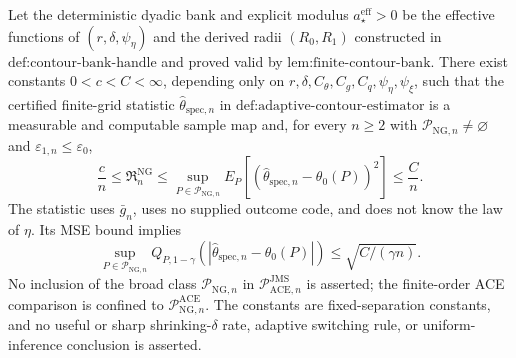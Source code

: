 Let the deterministic dyadic bank and explicit modulus \(a_{\star}^{\mathrm{eff}}>0\) be the effective functions of \((r,\delta,\psi_{\eta})\) and the derived radii \((R_0,R_1)\) constructed in \(\text{def:contour-bank-handle}\) and proved valid by \(\text{lem:finite-contour-bank}\).  There exist constants \(0<c<C<\infty\), depending only on \(r,\delta,C_{\theta},C_g,C_q,\psi_{\eta},\psi_{\xi}\), such that the certified finite-grid statistic \(\widehat\theta_{\mathrm{spec},n}\) in \(\text{def:adaptive-contour-estimator}\) is a measurable and computable sample map and, for every \(n\ge2\) with \(\mathcal P_{\mathrm{NG},n}\neq\varnothing\) and \(\varepsilon_{1,n}\le\varepsilon_0\),
\[
 \frac cn\le\mathfrak R_n^{\mathrm{NG}}
 \le\sup_{P\in\mathcal P_{\mathrm{NG},n}}
 E_P[(\widehat\theta_{\mathrm{spec},n}-\theta_0(P))^2]
 \le\frac Cn.
\]
The statistic uses \(\bar g_n\), uses no supplied outcome code, and does not know the law of \(\eta\).  Its MSE bound implies
\[
 \sup_{P\in\mathcal P_{\mathrm{NG},n}}
 Q_{P,1-\gamma}(|\widehat\theta_{\mathrm{spec},n}-\theta_0(P)|)
 \le\sqrt{C/(\gamma n)}.
\]
No inclusion of the broad class \(\mathcal P_{\mathrm{NG},n}\) in \(\mathcal P_{\mathrm{ACE},n}^{\mathrm{JMS}}\) is asserted; the finite-order ACE comparison is confined to \(\mathcal P_{\mathrm{NG},n}^{\mathrm{ACE}}\).  The constants are fixed-separation constants, and no useful or sharp shrinking-\(\delta\) rate, adaptive switching rule, or uniform-inference conclusion is asserted.